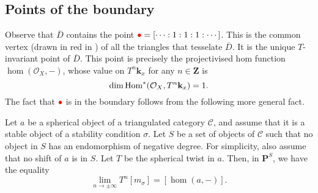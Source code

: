 \documentclass{amsart}
\begin{document}
\subsection{Points of the boundary}\label{sec:boundary}
Observe that \(\overline D\) contains the point \(\textcolor{red}{\bullet} = [\cdots :1:1:1: \cdots]\).
This is the common vertex (drawn in red in ) of all the triangles that tesselate \(\overline D\).
It is the unique \(T\)-invariant point of \(\overline D\).
This point is precisely the projectivised hom function \(\hom(\mathcal{O}_X,-)\), whose value on \(T^n \mathbf{k}_x\) for any \(n \in \mathbf{Z}\) is
\[ \dim \operatorname{Hom}^{*}(\mathcal{O}_{X}, T^n\mathbf{k}_x) = 1.\]
The fact that \(\textcolor{red}{\bullet}\) is in the boundary follows from the following more general fact.
\begin{theorem}
  Let \(a\) be a spherical object of a triangulated category \(\mathcal{C}\), and assume that it is a stable object of a stability condition \(\sigma\).
  Let \(S\) be a set of objects of \(\mathcal{C}\) such that no object in \(S\) has an endomorphism of negative degree.
  For simplicity, also assume that no shift of \(a\) is in \(S\).
  Let \(T\) be the spherical twist in \(a\).
  Then, in \(\mathbf{P}^S\), we have the equality
  \[\lim_{n \to \pm \infty} T^n[m_{\sigma}] = [ \hom(a,-)].\]
\end{theorem}
\end{document}
